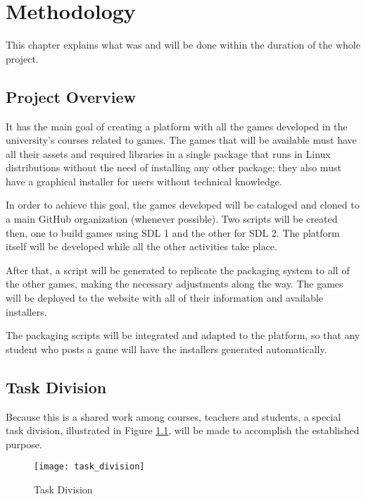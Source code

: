 \chapter{Methodology}
\label{sec:methodology}

This chapter explains what was and will be done within the duration of the whole project.

\section{Project Overview}
\label{sec:project_overview}

It has the main goal of creating a platform with all the games developed in the university's courses related to games. The games that will be available must have all their assets and required libraries in a single package that runs in Linux distributions without the need of installing any other package; they also must have a graphical installer for users without technical knowledge.

In order to achieve this goal, the games developed will be cataloged and cloned to a main GitHub organization (whenever possible). Two scripts will be created then, one to build games using SDL 1 and the other for SDL 2. The platform itself will be developed while all the other activities take place.

After that, a script will be generated to replicate the packaging system to all of the other games, making the necessary adjustments along the way. The games will be deployed to the website with all of their information and available installers.

The packaging scripts will be integrated and adapted to the platform, so that any student who posts a game will have the installers generated automatically.

\section{Task Division}
\label{sec:task_division}

Because this is a shared work among courses, teachers and students, a special task division, illustrated in Figure \ref{fig:task_division}, will be made to accomplish the established purpose.

\begin{figure}[h!]
\centering
\texttt{[image: task\_division]}
\caption{Task Division}
\label{fig:task_division}
\end{figure}

